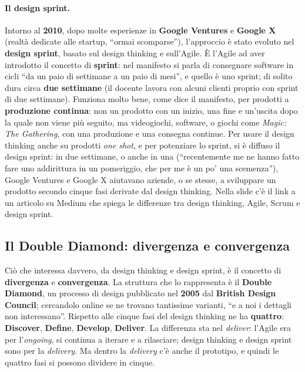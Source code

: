 \paragraph{Il design sprint.} Intorno al \textbf{2010}, dopo molte esperienze in
\textbf{Google Ventures} e \textbf{Google X} (realtà dedicate alle startup, ``ormai
scomparse''), l'approccio è stato evoluto nel \textbf{design sprint}, basato sul design
thinking e sull'Agile. È l'Agile ad aver introdotto il concetto di \textbf{sprint}: nel
manifesto si parla di consegnare software in cicli ``da un paio di settimane a un paio di
mesi'', e quello è uno sprint; di solito dura circa \textbf{due settimane} (il docente
lavora con alcuni clienti proprio con sprint di due settimane). Funziona molto bene,
come dice il manifesto, per prodotti a \textbf{produzione continua}: non un prodotto con
un inizio, una fine e un'uscita dopo la quale non viene più seguito, ma videogiochi,
software, o giochi come \emph{Magic: The Gathering}, con una produzione e una consegna
continue. Per usare il design thinking anche su prodotti \emph{one shot}, e per
potenziare lo sprint, si è diffuso il design sprint: in due settimane, o anche in una
(``recentemente me ne hanno fatto fare uno addirittura in un pomeriggio, che per me è un
po' una scemenza''), Google Ventures e Google X aiutavano aziende, o se stesse, a
sviluppare un prodotto secondo cinque fasi derivate dal design thinking. Nella slide c'è
il link a un articolo su Medium che spiega le differenze tra design thinking, Agile,
Scrum e design sprint.

\subsection{Il Double Diamond: divergenza e convergenza}



Ciò che interessa davvero, da design thinking e design sprint, è il concetto di
\textbf{divergenza} e \textbf{convergenza}. La struttura che lo rappresenta è il
\textbf{Double Diamond}, un processo di design pubblicato nel \textbf{2005} dal
\textbf{British Design Council}; cercandolo online se ne trovano tantissime varianti,
``e a noi i dettagli non interessano''. Rispetto alle cinque fasi del design thinking ne
ha \textbf{quattro}: \textbf{Discover}, \textbf{Define}, \textbf{Develop},
\textbf{Deliver}. La differenza sta nel \emph{deliver}: l'Agile era per l'\emph{ongoing},
si continua a iterare e a rilasciare; design thinking e design sprint sono per la
\emph{delivery}. Ma dentro la \emph{delivery} c'è anche il prototipo, e quindi le quattro
fasi si possono dividere in cinque.

